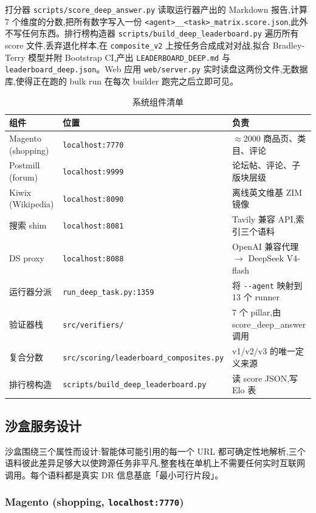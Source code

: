 \documentclass[UTF8,a4paper,12pt,oneside]{ctexart}
\begin{document}
打分器 \texttt{scripts/score\_deep\_answer.py} 读取运行器产出的 Markdown 报告,计算 7 个维度的分数,把所有数字写入一份 \texttt{<agent>\_\_<task>\_matrix.score.json},此外不写任何东西。排行榜构造器 \texttt{scripts/build\_deep\_leaderboard.py} 遍历所有 score 文件,丢弃退化样本,在 \texttt{composite\_v2} 上按任务合成成对对战,拟合 Bradley-Terry 模型并附 Bootstrap CI,产出 \texttt{LEADERBOARD\_DEEP.md} 与 \texttt{leaderboard\_deep.json}。Web 应用 \texttt{web/server.py} 实时读盘这两份文件,无数据库,使得正在跑的 bulk run 在每次 builder 跑完之后立即可见。

\begin{table}[ht]
\centering
\small
\caption{系统组件清单}
\begin{tabular}{lll}
\toprule
组件 & 位置 & 负责 \\
\midrule
Magento (shopping) & \texttt{localhost:7770} & \(\approx\)2000 商品页、类目、评论 \\
Postmill (forum) & \texttt{localhost:9999} & 论坛帖、评论、子版块层级 \\
Kiwix (Wikipedia) & \texttt{localhost:8090} & 离线英文维基 ZIM 镜像 \\
搜索 shim & \texttt{localhost:8081} & Tavily 兼容 API,索引三个语料 \\
DS proxy & \texttt{localhost:8088} & OpenAI 兼容代理 \(\to\) DeepSeek V4-flash \\
运行器分派 & \texttt{run\_deep\_task.py:1359} & 将 \texttt{-{}-agent} 映射到 13 个 runner \\
验证器栈 & \texttt{src/verifiers/} & 7 个 pillar,由 score\_deep\_answer 调用 \\
复合分数 & \texttt{src/scoring/leaderboard\_composites.py} & v1/v2/v3 的唯一定义来源 \\
排行榜构造 & \texttt{scripts/build\_deep\_leaderboard.py} & 读 score JSON,写 Elo 表 \\
\bottomrule
\end{tabular}
\end{table}

\subsection{沙盒服务设计}

沙盒围绕三个属性而设计:智能体可能引用的每一个 URL 都可确定性地解析,三个语料彼此差异足够大以使跨源任务非平凡,整套栈在单机上不需要任何实时互联网调用。每个语料都是真实 DR 信息基底「最小可行片段」。

\subsubsection{Magento (shopping, \texttt{localhost:7770})}
\end{document}
